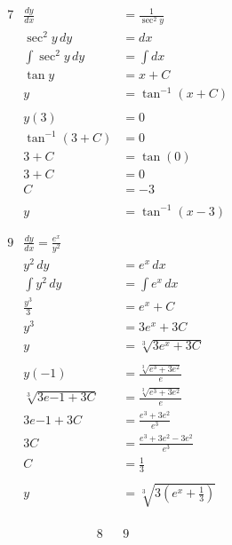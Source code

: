 \documentclass[12pt]{article}
\begin{document}
\begin{multicols}{2}
    \begin{align*}
        &7 & \frac{dy}{dx} &= \frac{1}{\sec^2\! y} \\
        &&\sec^2\! y\,dy &= dx \\
        &&\int \sec^2\!y\,dy &= \int dx \\
        &&\tan y &= x + C \\
        &&y &= \tan^{-1}(x + C) \\ \\
        &&y(3) &= 0 \\ 
        &&\tan^{-1}(3 + C) &= 0 \\
        &&3+C &= \tan(0) \\
        &&3 + C &= 0 \\
        &&C &= -3 \\ \\
        &&y &= \tan^{-1}(x - 3)  \\ \\ \\
        &9&\frac{dy}{dx} = \frac{e^x}{y^2} \\
        &&y^2\,dy &= e^x\,dx \\
        &&\int y^2\,dy &= \int e^x\,dx \\
        &&\frac{y^3}{3} &= e^x + C \\
        &&y^3 &= 3e^x + 3C \\
        &&y &= \sqrt[3]{3e^x + 3C} \\ \\
        &&y(-1) &= \frac{\sqrt[3]{e^3 + 3e^2}}{e} \\
        &&\sqrt[3]{3e{-1} + 3C} &= \frac{\sqrt[3]{e^3 + 3e^2}}{e} \\
        &&3e{-1} + 3C &= \frac{e^3 + 3e^2}{e^3} \\
        &&3C &= \frac{e^3 + 3e^2 - 3e^2}{e^3} \\
        &&C &= \frac{1}{3} \\ \\
        &&y &= \sqrt[3]{3\left(e^x + \frac{1}{3}\right)} \\ \\ \\ 
    \end{align*}
    \columnbreak
    \begin{align*}
        &8&
        &9&
    \end{align*}
\end{multicols}
\end{document}
